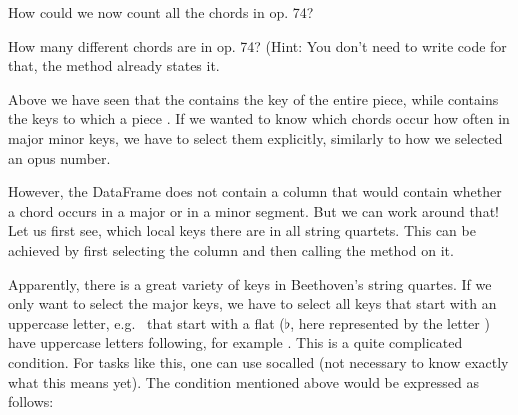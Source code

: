 \documentclass[letterpaper,10pt,english]{sphinxmanual}
\begin{document}
How could we now count all the chords in op. 74?

{
\begin{sphinxVerbatim}[commandchars=\\\{\}]
\llap{\color{nbsphinxin}[ ]:\,\hspace{\fboxrule}\hspace{\fboxsep}}
\end{sphinxVerbatim}
}

How many different chords are in op. 74? (Hint: You don’t need to write code for that, the  method already states it.

Above we have seen that the  contains the key of the entire piece, while  contains the keys to which a piece . If we wanted to know which chords occur how often  in major  minor keys, we have to select them explicitly, similarly to how we selected an opus number.

However, the DataFrame does not contain a  column that would contain whether a chord occurs in a major or in a minor segment. But we can work around that! Let us first see, which local keys there are in all string quartets. This can be achieved by first selecting the  column and then calling the  method on it.

{
\begin{sphinxVerbatim}[commandchars=\\\{\}]
\llap{\color{nbsphinxin}[ ]:\,\hspace{\fboxrule}\hspace{\fboxsep}}
\end{sphinxVerbatim}
}

Apparently, there is a great variety of keys in Beethoven’s string quartes. If we only want to select the major keys, we have to select all keys that start with an uppercase letter, e.g.   that start with a flat (\(\flat\), here represented by the letter )  have uppercase letters following, for example . This is a quite complicated condition. For tasks like this, one can use so\sphinxhyphen{}called  (not necessary to know exactly what this means
yet). The condition mentioned above would be expressed as follows:
\end{document}

